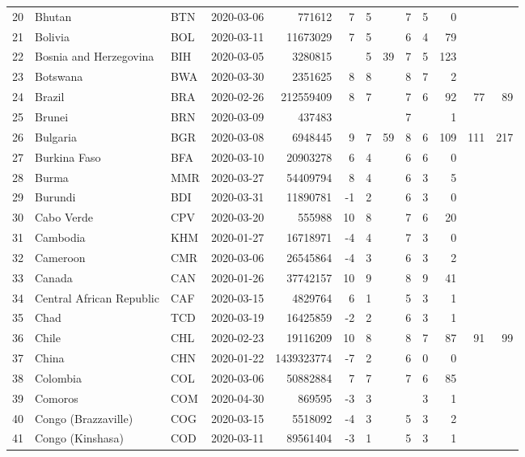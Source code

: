 \begin{longtable}{rlllrrrrrrrrr}
  20 & Bhutan & BTN & 2020-03-06 & 771612 & 7 & 5 &  & 7 & 5 & 0 &  &  \\ 
  21 & Bolivia & BOL & 2020-03-11 & 11673029 & 7 & 5 &  & 6 & 4 & 79 &  &  \\ 
  22 & Bosnia and Herzegovina & BIH & 2020-03-05 & 3280815 &  & 5 & 39 & 7 & 5 & 123 &  &  \\ 
  23 & Botswana & BWA & 2020-03-30 & 2351625 & 8 & 8 &  & 8 & 7 & 2 &  &  \\ 
  24 & Brazil & BRA & 2020-02-26 & 212559409 & 8 & 7 &  & 7 & 6 & 92 & 77 & 89 \\ 
  25 & Brunei & BRN & 2020-03-09 & 437483 &  &  &  & 7 &  & 1 &  &  \\ 
  26 & Bulgaria & BGR & 2020-03-08 & 6948445 & 9 & 7 & 59 & 8 & 6 & 109 & 111 & 217 \\ 
  27 & Burkina Faso & BFA & 2020-03-10 & 20903278 & 6 & 4 &  & 6 & 6 & 0 &  &  \\ 
  28 & Burma & MMR & 2020-03-27 & 54409794 & 8 & 4 &  & 6 & 3 & 5 &  &  \\ 
  29 & Burundi & BDI & 2020-03-31 & 11890781 & -1 & 2 &  & 6 & 3 & 0 &  &  \\ 
  30 & Cabo Verde & CPV & 2020-03-20 & 555988 & 10 & 8 &  & 7 & 6 & 20 &  &  \\ 
  31 & Cambodia & KHM & 2020-01-27 & 16718971 & -4 & 4 &  & 7 & 3 & 0 &  &  \\ 
  32 & Cameroon & CMR & 2020-03-06 & 26545864 & -4 & 3 &  & 6 & 3 & 2 &  &  \\ 
  33 & Canada & CAN & 2020-01-26 & 37742157 & 10 & 9 &  & 8 & 9 & 41 &  &  \\ 
  34 & Central African Republic & CAF & 2020-03-15 & 4829764 & 6 & 1 &  & 5 & 3 & 1 &  &  \\ 
  35 & Chad & TCD & 2020-03-19 & 16425859 & -2 & 2 &  & 6 & 3 & 1 &  &  \\ 
  36 & Chile & CHL & 2020-02-23 & 19116209 & 10 & 8 &  & 8 & 7 & 87 & 91 & 99 \\ 
  37 & China & CHN & 2020-01-22 & 1439323774 & -7 & 2 &  & 6 & 0 & 0 &  &  \\ 
  38 & Colombia & COL & 2020-03-06 & 50882884 & 7 & 7 &  & 7 & 6 & 85 &  &  \\ 
  39 & Comoros & COM & 2020-04-30 & 869595 & -3 & 3 &  &  & 3 & 1 &  &  \\ 
  40 & Congo (Brazzaville) & COG & 2020-03-15 & 5518092 & -4 & 3 &  & 5 & 3 & 2 &  &  \\ 
  41 & Congo (Kinshasa) & COD & 2020-03-11 & 89561404 & -3 & 1 &  & 5 & 3 & 1 &  &  \\ 

\end{longtable}
